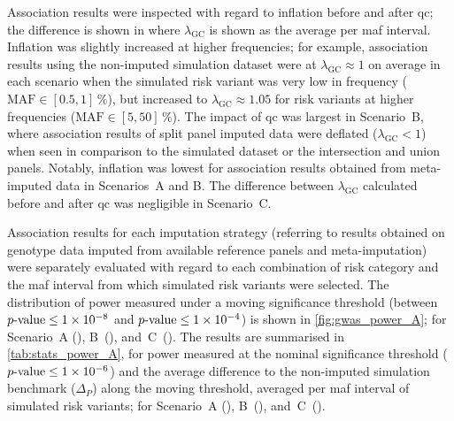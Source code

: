 %

%

Association results were inspected with regard to inflation before and after \gls{qc}; the difference is shown in  where $\lambda_\text{GC}$ is shown as the average per \gls{maf} interval.
Inflation was slightly increased at higher frequencies; for example, association results using the non-imputed simulation dataset were at ${\lambda_\text{GC} \approx 1}$ on average in each scenario when the simulated risk variant was very low in frequency (${\text{MAF} \in [0.5, 1]\,\%}$), but increased to ${\lambda_\text{GC} \approx 1.05}$ for risk variants at higher frequencies (${\text{MAF} \in [5, 50]\,\%}$).
The impact of \gls{qc} was largest in Scenario~B, where association results of split panel imputed data were deflated (${\lambda_\text{GC} < 1}$) when seen in comparison to the simulated dataset or the intersection and union panels.
Notably, inflation was lowest for association results obtained from meta-imputed data in Scenarios~A and B.
The difference between $\lambda_\text{GC}$ calculated before and after \gls{qc} was negligible in Scenario~C.

%

%

%

%

Association results for each imputation strategy (referring to results obtained on genotype data imputed from available reference panels and meta-imputation) were separately evaluated with regard to each combination of risk category and the \gls{maf} interval from which simulated risk variants were selected.
The distribution of power measured under a moving significance threshold (between ${\mbox{$p$-value}\leq1\times10^{-8}}$ and ${\mbox{$p$-value}\leq1\times10^{-4}}$) is shown in \cref{fig:gwas_power_A}; for Scenario~A (), B~(), and~C~().
The results are summarised in \cref{tab:stats_power_A}, for power measured at the nominal significance threshold (${\mbox{$p$-value}\leq1\times10^{-6}}$) and the average difference to the non-imputed simulation benchmark ($\Delta_P$) along the moving threshold, averaged per \gls{maf} interval of simulated risk variants; for Scenario~A (), B~(), and~C~().

